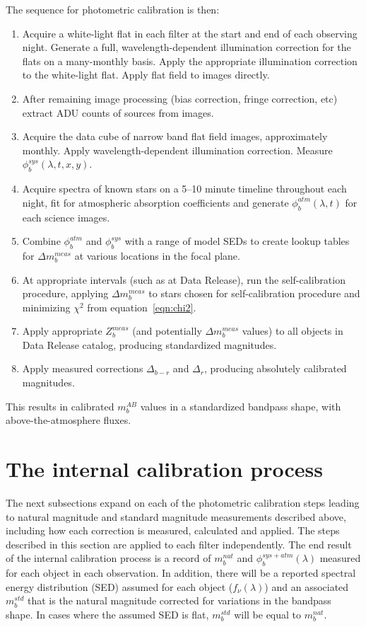 \documentclass[12pt,preprint]{aastex}
\begin{document}
The sequence for photometric calibration is then:
\begin{enumerate}
\item{Acquire a white-light flat in each filter at the start and end
of each observing night. Generate a full, wavelength-dependent
illumination correction for the flats on a many-monthly basis. Apply
the appropriate illumination correction to the white-light flat. Apply
flat field to images directly.}
\item{After remaining image processing (bias correction, fringe
correction, etc) extract ADU counts of sources from images. }
\item{Acquire the data cube of narrow band flat field images,
approximately monthly. Apply wavelength-dependent illumination
correction. Measure $\phi_b^{sys}(\lambda,t,x,y)$. }
\item{Acquire spectra of known stars on a 5--10 minute timeline
throughout each night, fit for atmospheric absorption coefficients and
generate $\phi_b^{atm}(\lambda,t)$ for each science images. }
\item{Combine $\phi_b^{atm}$ and $\phi_b^{sys}$ with a range of model
SEDs to create lookup tables for $\Delta m_b^{meas}$ at various
locations in the focal plane. }
\item{At appropriate intervals (such as at Data Release), run the
self-calibration procedure, applying $\Delta m_b^{meas}$ to stars
chosen for self-calibration procedure and minimizing $\chi^2$ from
equation~\ref{eqn:chi2}.}
\item{Apply appropriate $Z_b^{meas}$ (and potentially $\Delta
m_b^{meas}$ values) to all objects in Data Release catalog, producing
standardized magnitudes.}
\item{Apply measured corrections $\Delta_{b-r}$ and $\Delta_r$,
producing absolutely calibrated magnitudes.}
\end{enumerate}
This results in calibrated $m_b^{AB}$ values in a standardized
bandpass shape, with above-the-atmosphere fluxes.

\section{The internal calibration process}
\label{sec:calib_details}

The next subsections expand on each of the photometric calibration
steps leading to natural magnitude and standard magnitude measurements
described above, including how each correction is measured, calculated
and applied.  The steps described in this section are applied to each
filter independently. The end result of the internal calibration
process is a record of $m_b^{nat}$ and $\phi_b^{sys+atm}(\lambda)$
measured for each object in each observation. In addition, there will
be a reported spectral energy distribution (SED) assumed for each
object ($f_\nu(\lambda)$) and an associated $m_b^{std}$ that is the
natural magnitude corrected for variations in the bandpass shape. In
cases where the assumed SED is flat, $m_b^{std}$ will be equal to
$m_b^{nat}$.
 
\end{document}
